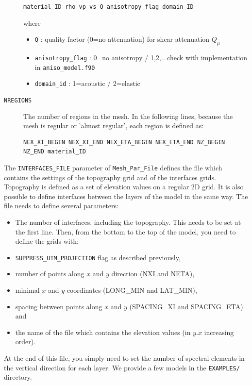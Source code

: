 \begin{description}
\begin{verbatim}
material_ID rho vp vs Q anisotropy_flag domain_ID
\end{verbatim}

\noindent
where
\begin{itemize}
\item \texttt{Q} : quality factor (0=no attenuation) for shear attenuation $Q_{\mu}$
\item \texttt{anisotropy\_flag} : 0=no anisotropy / 1,2,.. check with implementation
in \texttt{aniso\_model.f90}
\item \texttt{domain\_id} : 1=acoustic / 2=elastic
\end{itemize}
\item [{\texttt{NREGIONS}}] The number of regions in the mesh. In the following
lines, because the mesh is regular or 'almost regular', each region
is defined as:
\begin{verbatim}
NEX_XI_BEGIN NEX_XI_END NEX_ETA_BEGIN NEX_ETA_END NZ_BEGIN NZ_END material_ID
\end{verbatim}
\end{description}
%
The \texttt{INTERFACES\_FILE} parameter of \texttt{Mesh\_Par\_File}
defines the file which contains the settings of the topography grid
and of the interfaces grids. Topography is defined as a set of elevation
values on a regular 2D grid. It is also possible to define interfaces
between the layers of the model in the same way. The file needs to
define several parameters:
\begin{itemize}
\item The number of interfaces, including the topography. This needs to
be set at the first line. Then, from the bottom to the top of the
model, you need to define the grids with:
\item \texttt{SUPPRESS\_UTM\_PROJECTION} flag as described previously,
\item number of points along $x$ and $y$ direction (NXI and NETA),
\item minimal $x$ and $y$ coordinates (LONG\_MIN and LAT\_MIN),
\item spacing between points along $x$ and $y$ (SPACING\_XI and SPACING\_ETA)
and
\item the name of the file which contains the elevation values (in $y$.$x$
increasing order).
\end{itemize}
%
At the end of this file, you simply need to set the number of spectral
elements in the vertical direction for each layer. We provide a few
models in the {\texttt{EXAMPLES/}} directory.\\


